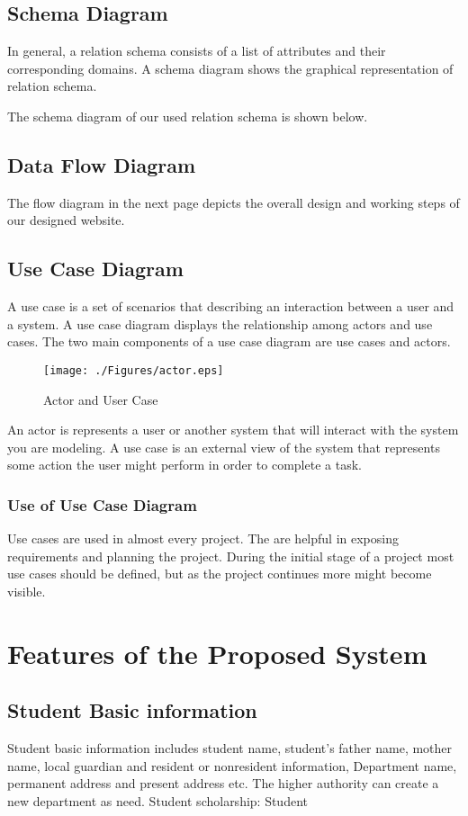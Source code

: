 \subsection{Schema Diagram}
In general, a relation schema consists of a list of attributes and
their corresponding domains. A schema diagram shows the graphical
representation of relation schema.

The schema diagram of our used relation schema is shown below.
\subsection{Data Flow Diagram}
The flow diagram in the next page depicts the overall design and
working steps of our designed  website.

\subsection{Use Case Diagram}
A use case is a set of scenarios that describing an interaction
between a user and a system.  A use case diagram displays the
relationship among actors and use cases.  The two main components
of a use case diagram are use cases and
actors\citep{mellor2004mda}.

\begin{figure}[htbp]
  \centering
\texttt{[image: ./Figures/actor.eps]}
  \caption[Actor and User case]{Actor and User Case}
  \label{fig:Actor}
\end{figure}

An actor is represents a user or another system that will interact
with the system you are modeling.  A use case is an external view
of the system that represents some action the user might perform
in order to complete a task\citep{mellor2004mda}.
\subsubsection{Use of Use Case Diagram}
Use cases are used in almost every project.  The are helpful in
exposing requirements and planning the project. During the initial
stage of a project most use cases should be defined, but as the
project continues more might become visible\citep{mellor2004mda}.
\section{Features of the Proposed System}
\subsection{Student Basic information}
 Student basic information includes
student name, student's father name, mother name, local guardian
and resident or nonresident information, Department name,
permanent address and present address etc.  The higher authority
can create a new department as need. Student scholarship: Student

